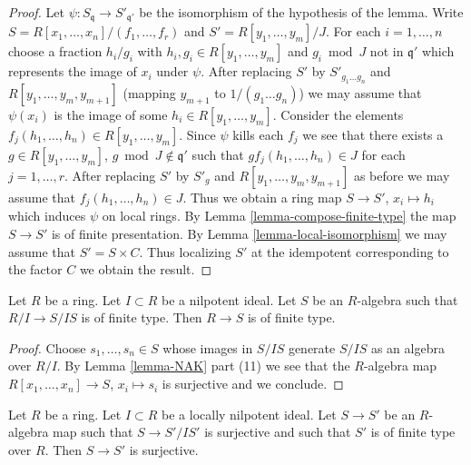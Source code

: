 \begin{proof}
Let $\psi : S_{\mathfrak q} \to S'_{\mathfrak q'}$ be the isomorphism
of the hypothesis of the lemma.
Write $S = R[x_1, \ldots, x_n]/(f_1, \ldots, f_r)$ and
$S' = R[y_1, \ldots, y_m]/J$.
For each $i = 1, \ldots, n$ choose a fraction
$h_i/g_i$ with $h_i, g_i \in R[y_1, \ldots, y_m]$
and $g_i \bmod J$ not in $\mathfrak q'$ which represents
the image of $x_i$ under $\psi$. After replacing
$S'$ by $S'_{g_1 \ldots g_n}$ and
$R[y_1, \ldots, y_m, y_{m + 1}]$ (mapping $y_{m + 1}$ to $1/(g_1\ldots g_n)$)
we may assume that $\psi(x_i)$ is the image of some
$h_i \in R[y_1, \ldots, y_m]$. Consider the elements
$f_j(h_1, \ldots, h_n) \in R[y_1, \ldots, y_m]$.
Since $\psi$ kills each $f_j$ we see that
there exists a $g \in R[y_1, \ldots, y_m]$, $g \bmod J \not \in \mathfrak q'$
such that $g f_j(h_1, \ldots, h_n) \in J$ for each $j = 1, \ldots, r$.
After replacing $S'$ by $S'_g$ and
$R[y_1, \ldots, y_m, y_{m + 1}]$ as before we may assume that
$f_j(h_1, \ldots, h_n) \in J$. Thus we obtain a ring map
$S \to S'$, $x_i \mapsto h_i$ which induces $\psi$ on local rings.
By Lemma \ref{lemma-compose-finite-type}
the map $S \to S'$ is of finite presentation.
By Lemma \ref{lemma-local-isomorphism}
we may assume that $S' = S \times C$. Thus localizing $S'$ at the
idempotent corresponding to the factor $C$ we obtain the result.
\end{proof}

\begin{lemma}
\label{lemma-finite-type-mod-nilpotent}
Let $R$ be a ring. Let $I \subset R$ be a nilpotent ideal.
Let $S$ be an $R$-algebra such that $R/I \to S/IS$
is of finite type. Then $R \to S$ is of finite type.
\end{lemma}

\begin{proof}
Choose $s_1, \ldots, s_n \in S$ whose images in $S/IS$ generate
$S/IS$ as an algebra over $R/I$. By Lemma \ref{lemma-NAK} part (11)
we see that the $R$-algebra map $R[x_1, \ldots, x_n] \to S$, $x_i \mapsto s_i$
is surjective and we conclude.
\end{proof}

\begin{lemma}
\label{lemma-surjective-mod-locally-nilpotent}
Let $R$ be a ring. Let $I \subset R$ be a locally nilpotent ideal.
Let $S \to S'$ be an $R$-algebra map such that $S \to S'/IS'$ is surjective
and such that $S'$ is of finite type over $R$. Then $S \to S'$ is surjective.
\end{lemma}

